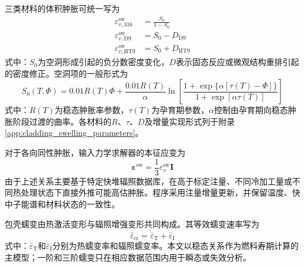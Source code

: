 三类材料的体积肿胀可统一写为
\begin{subequations}\label{eq:clad_volumetric_swelling_models}
	\begin{align}
		\varepsilon_{v,316}^{\mathrm{sw}}
		&=\frac{S_0}{1-S_0}
		\label{eq:ss316_volumetric_swelling}\\
		\varepsilon_{v,\mathrm{D9}}^{\mathrm{sw}}
		&=S_0-D_{\mathrm{D9}}
		\label{eq:d9_volumetric_swelling}\\
		\varepsilon_{v,\mathrm{HT9}}^{\mathrm{sw}}
		&=S_0+D_{\mathrm{HT9}}
		\label{eq:ht9_volumetric_swelling}
	\end{align}
\end{subequations}
式中：$S_0$为空洞形成引起的负分数密度变化，$D$表示固态反应或微观结构重排引起的密度修正。空洞项的一般形式为
\begin{equation}
	S_0(T,\Phi)
	=0.01R(T)\Phi+
	\frac{0.01R(T)}{\alpha}
	\ln\!\left[
	\frac{1+\exp\{\alpha[\tau(T)-\Phi]\}}
	{1+\exp[\alpha\tau(T)]}
	\right]
	\label{eq:clad_void_swelling_inventory}
\end{equation}
式中：$R(T)$为稳态肿胀率参数，$\tau(T)$为孕育期参数，$\alpha$控制由孕育期向稳态肿胀阶段过渡的曲率。各材料的$R$、$\tau$、$D$及增量实现形式列于附录\ref{app:cladding_swelling_parameters}。

对于各向同性肿胀，输入力学求解器的本征应变为
\begin{equation}
	\boldsymbol{\varepsilon}^{\mathrm{sw}}
	=\frac{1}{3}\varepsilon_v^{\mathrm{sw}}\boldsymbol I
	\label{eq:clad_isotropic_swelling_eigenstrain}
\end{equation}
由于上述关系主要基于特定快堆辐照数据库，在高于标定注量、不同冷加工量或不同热处理状态下直接外推可能高估肿胀。程序采用注量增量更新，并保留温度、快中子能谱和材料状态的一致性。

\label{sec:cladding_creep}

包壳蠕变由热激活变形与辐照增强变形共同构成。其等效蠕变速率写为
\begin{equation}
	\dot{\bar\varepsilon}_{\mathrm{cr}}
	=\dot{\bar\varepsilon}_{\mathrm T}
	+\dot{\bar\varepsilon}_{\mathrm I}
	\label{eq:clad_total_creep_rate}
\end{equation}
式中：$\dot{\bar\varepsilon}_{\mathrm T}$和$\dot{\bar\varepsilon}_{\mathrm I}$分别为热蠕变率和辐照蠕变率。本文以稳态关系作为燃料寿期计算的主模型；一阶和三阶蠕变只在相应数据范围内用于瞬态或失效分析。

